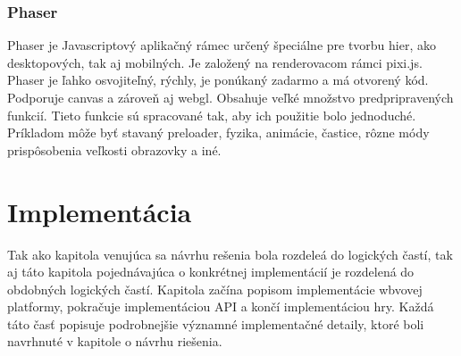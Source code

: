 \subsection{Phaser}
\label{sec:phaser}
Phaser je Javascriptový aplikačný rámec určený špeciálne pre tvorbu hier, ako desktopových, tak aj mobilných. Je založený na renderovacom rámci pixi.js. Phaser je ľahko osvojiteľný, rýchly, je ponúkaný zadarmo a má otvorený kód. Podporuje canvas a zároveň aj webgl. Obsahuje veľké množstvo predpripravených funkcií. Tieto funkcie sú spracované tak, aby ich použitie bolo jednoduché. Príkladom môže byť stavaný preloader, fyzika, animácie, častice, rôzne módy prispôsobenia veľkosti obrazovky a iné. \cite{phaser}


\chapter{Implementácia}
\label{chap:implementacia}
Tak ako kapitola venujúca sa návrhu rešenia bola rozdeleá do logických častí, tak aj táto kapitola pojednávajúca o konkrétnej implementácií je rozdelená do obdobných logických častí. Kapitola začína popisom implementácie wbvovej platformy, pokračuje implementáciou API a končí implementáciou hry.  Každá táto časť popisuje podrobnejšie významné implementačné detaily, ktoré boli navrhnuté v kapitole o návrhu riešenia. 

